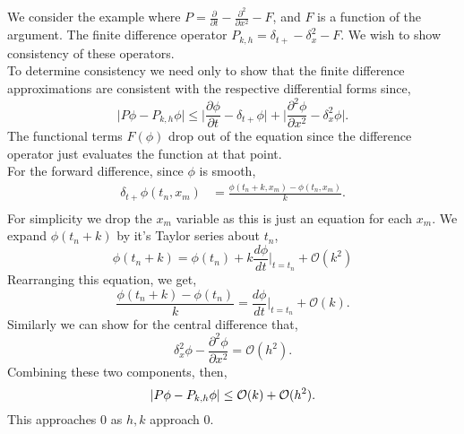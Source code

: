 \begin{exmp}
We consider the example where $P=\frac{\partial}{\partial t}-\frac{\partial^2}{\partial x^2}-F$, and $F$ is a function of the argument. The finite difference operator $P_{k,h}=\delta_{t+}-\delta_x^2-F$. We wish to show consistency of these operators.\\
To determine consistency we need only to show that the finite difference approximations are consistent with the respective differential forms since, 
\begin{equation}
\lvert P\phi-P_{k,h}\phi\rvert\leq \bigg\lvert \frac{\partial\phi}{\partial t}-\delta_{t+}\phi\bigg\rvert+\bigg\lvert \frac{\partial^2\phi}{\partial x^2} -\delta_x^2 \phi\bigg\rvert. 
\end{equation}
The functional terms $F(\phi)$ drop out of the equation since the difference operator just evaluates the function at that point. \\
For the forward difference, since $\phi$ is smooth,
\begin{align*}
\delta_{t+}\phi(t_n,x_m)&=\frac{\phi(t_n+k,x_m)-\phi(t_n,x_m)}{k}.\\
\end{align*}
For simplicity we drop the $x_m$ variable as this is just an equation for each $x_m$. We expand $\phi(t_n+k)$ by it's Taylor series about $t_n$,
$$\phi(t_n+k)=\phi(t_n)+k\frac{d\phi}{dt}\bigg\rvert_{t=t_n}+\mathcal{O}(k^2)$$
Rearranging this equation, we get,
\begin{equation}
\frac{\phi(t_n+k)-\phi(t_n)}{k}=\frac{d\phi}{dt}\bigg\rvert_{t=t_n}+\mathcal{O}(k). 
\end{equation}
Similarly we can show for the central difference that,
\begin{equation}
\delta_x^2\phi-\frac{\partial^2\phi}{\partial x^2}=\mathcal{O}(h^2). \label{accuracy}
\end{equation} 
Combining these two components, then,
\begin{equation}
\lvert P\phi-P_{k,h}\phi\rvert\leq\mathcal{O}(k)+\mathcal{O}(h^2). 
\end{equation}
This approaches 0 as $h,k$ approach $0$. 
\end{exmp}

